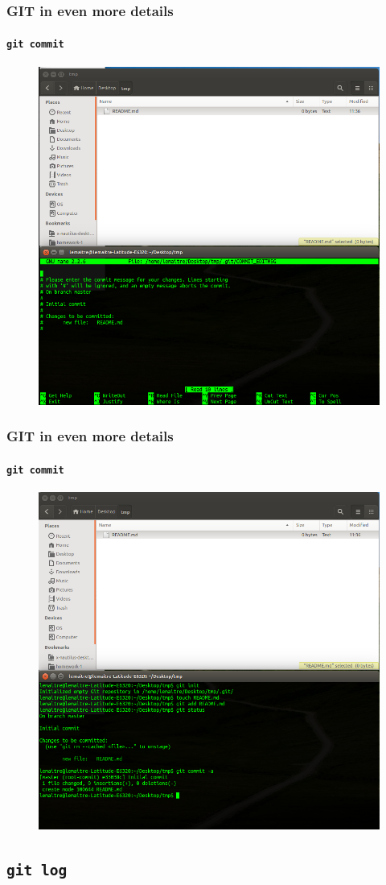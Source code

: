 \documentclass{beamer}
\begin{document}
\begin{frame}
  \frametitle{GIT in even more details}
  \framesubtitle{\texttt{git commit}}
  \begin{figure}
      \centering
      \includegraphics[width=.65\textwidth]{./images/workflow/commit-editor.png}
    \end{figure}
\end{frame}

\begin{frame}
  \frametitle{GIT in even more details}
  \framesubtitle{\texttt{git commit}}
  \begin{figure}
      \centering
      \includegraphics[width=.65\textwidth]{./images/workflow/commit-report.png}
    \end{figure}
\end{frame}

\subsection{\texttt{git log}}
\end{document}
